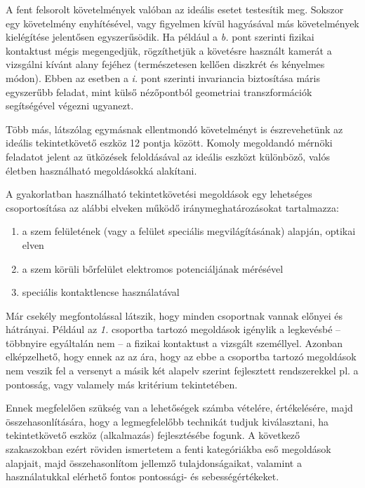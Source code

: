 A fent felsorolt követelmények valóban az ideális esetet testesítik meg. Sokszor egy követelmény enyhítésével, vagy figyelmen kívül hagyásával más követelmények kielégítése jelentősen egyszerűsödik. Ha például a \emph{b.} pont szerinti fizikai kontaktust mégis megengedjük, rögzíthetjük a követésre használt kamerát a vizsgálni kívánt alany fejéhez (természetesen kellően diszkrét és kényelmes módon). Ebben az esetben a \emph{i.} pont szerinti invariancia biztosítása máris egyszerűbb feladat, mint külső nézőpontból geometriai transzformációk segítségével végezni ugyanezt.

Több más, látszólag egymásnak ellentmondó követelményt is észrevehetünk az ideális tekintetkövető eszköz 12 pontja között. Komoly megoldandó mérnöki feladatot jelent az ütközések feloldásával az ideális eszközt különböző, valós életben használható megoldásokká alakítani.

\bigskip

A gyakorlatban használható tekintetkövetési megoldások egy lehetséges csoportosítása az alábbi elveken működő iránymeghatározásokat tartalmazza:

\begin{enumerate}
 \item a szem felületének (vagy a felület speciális megvilágításának) alapján, optikai elven 
 \item a szem körüli bőrfelület elektromos potenciáljának mérésével
 \item speciális kontaktlencse használatával
\end{enumerate}

Már csekély megfontolással látszik, hogy minden csoportnak vannak előnyei és hátrányai. Például az \emph{1.} csoportba tartozó megoldások igénylik a legkevésbé -- többnyire egyáltalán nem -- a fizikai kontaktust a vizsgált személlyel. Azonban elképzelhető, hogy ennek az az ára, hogy az ebbe a csoportba tartozó megoldások nem veszik fel a versenyt a másik két alapelv szerint fejlesztett rendszerekkel pl. a pontosság, vagy valamely más kritérium tekintetében.

Ennek megfelelően szükség van a lehetőségek számba vételére, értékelésére, majd összehasonlítására, hogy a legmegfelelőbb technikát tudjuk kiválasztani, ha tekintetkövető eszköz (alkalmazás) fejlesztésébe fogunk. A következő szakaszokban ezért röviden ismertetem a fenti kategóriákba eső megoldások alapjait, majd összehasonlítom jellemző tulajdonságaikat, valamint a használatukkal elérhető fontos pontossági- és sebességértékeket.

